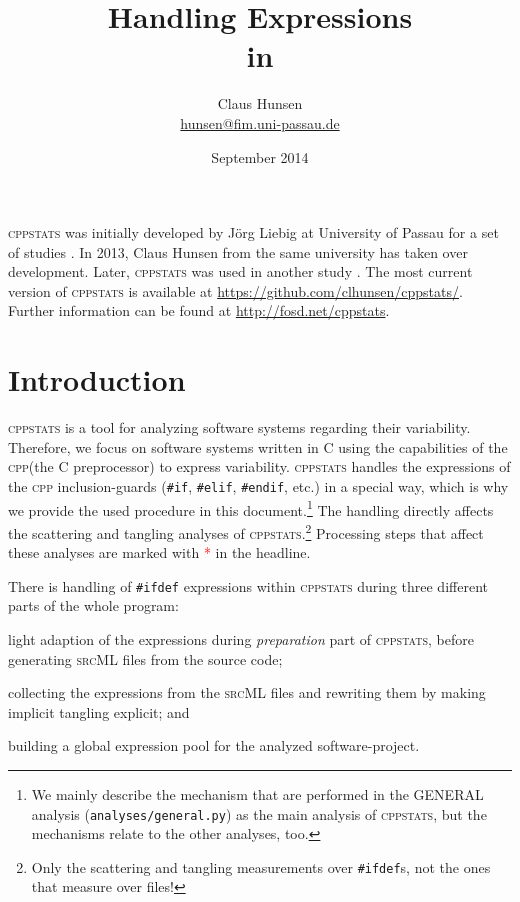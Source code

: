 \documentclass[a4paper]{scrartcl}
\title{Handling \ifdef Expressions\\in \cppstats}
\author{Claus Hunsen\\\url{hunsen@fim.uni-passau.de}}
\date{September 2014}
\newcommand\code[1]{\texttt{#1}}
\newcommand\tool[1]{\textsc{#1}}
\newcommand\ifdeff[1]{\code{\##1}\xspace}
\newcommand\ifdef[0]{{\upshape\ifdeff{ifdef}}\xspace}
\newcommand\ifdefs[0]{\ifdef{}s\xspace}
\newcommand\cppstats[0]{\tool{cppstats}\xspace}
\newcommand\cpp{\tool{cpp}\xspace}
\newcommand\affected{\textcolor{red}{*}\xspace}
\begin{document}
\maketitle



\begin{footnotesize}
\noindent \cppstats was initially developed by J\"org Liebig at University of Passau for a set of studies \cite{LiebigALKS10,LiebigKA11}.
In 2013, Claus Hunsen from the same university has taken over development.
Later, \cppstats was used in another study \cite{HunsenZSKLBA}.
The most current version of \cppstats is available at \url{https://github.com/clhunsen/cppstats/}.
Further information can be found at \url{http://fosd.net/cppstats}.
\end{footnotesize}

\section{Introduction}
\cppstats is a tool for analyzing software systems regarding their variability.
Therefore, we focus on software systems written in \tool{C} using the capabilities of the \cpp (the \tool{C} preprocessor) to express variability.
\cppstats handles the expressions of the \cpp inclusion-guards (\ifdeff{if}, \ifdeff{elif}, \ifdeff{endif}, etc.) in a special way, which is why we provide the used procedure in this document.\footnote{We mainly describe the mechanism that are performed in the \tool{GENERAL} analysis (\code{analyses/general.py}) as the main analysis of \cppstats, but the mechanisms relate to the other analyses, too.}
The handling directly affects the scattering and tangling analyses of \cppstats.\footnote{Only the scattering and tangling measurements over \ifdefs, not the ones that measure over files!}
Processing steps that affect these analyses are marked with \affected in the headline.

There is handling of \ifdef expressions within \cppstats during three different parts of the whole program:
\begin{inparaenum}[\itshape 1\upshape)]
\item light adaption of the expressions during \textit{preparation} part of \cppstats, before generating \tool{srcML} files from the source code;
\item collecting the expressions from the \tool{srcML} files and rewriting them by making implicit tangling explicit; and
\item building a global expression pool for the analyzed software-project.
\end{inparaenum}
\end{document}
